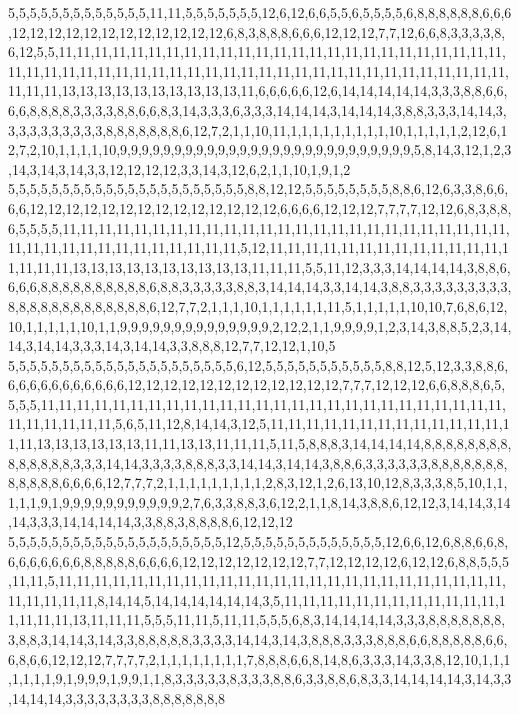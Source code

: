 5,5,5,5,5,5,5,5,5,5,5,5,5,11,11,5,5,5,5,5,5,5,12,6,12,6,6,5,5,6,5,5,5,5,6,8,8,8,8,8,8,6,6,6,12,12,12,12,12,12,12,12,12,12,12,12,6,8,3,8,8,8,6,6,6,12,12,12,7,7,12,6,6,8,3,3,3,3,8,6,12,5,5,11,11,11,11,11,11,11,11,11,11,11,11,11,11,11,11,11,11,11,11,11,11,11,11,11,11,11,11,11,11,11,11,11,11,11,11,11,11,11,11,11,11,11,11,11,11,11,11,11,11,11,11,11,11,11,11,13,13,13,13,13,13,13,13,13,13,11,6,6,6,6,6,12,6,14,14,14,14,14,3,3,3,8,8,6,6,6,6,8,8,8,8,3,3,3,3,8,8,6,6,8,3,14,3,3,3,6,3,3,3,14,14,14,3,14,14,14,3,8,8,3,3,3,14,14,3,3,3,3,3,3,3,3,3,3,8,8,8,8,8,8,8,6,12,7,2,1,1,10,11,1,1,1,1,1,1,1,1,1,10,1,1,1,1,1,2,12,6,12,7,2,10,1,1,1,1,10,9,9,9,9,9,9,9,9,9,9,9,9,9,9,9,9,9,9,9,9,9,9,9,9,9,9,9,5,8,14,3,12,1,2,3,14,3,14,3,14,3,3,12,12,12,12,3,3,14,3,12,6,2,1,1,10,1,9,1,2
5,5,5,5,5,5,5,5,5,5,5,5,5,5,5,5,5,5,5,5,5,5,8,8,12,12,5,5,5,5,5,5,5,5,8,8,6,12,6,3,3,8,6,6,6,6,12,12,12,12,12,12,12,12,12,12,12,12,12,12,6,6,6,6,12,12,12,7,7,7,7,12,12,6,8,3,8,8,6,5,5,5,5,11,11,11,11,11,11,11,11,11,11,11,11,11,11,11,11,11,11,11,11,11,11,11,11,11,11,11,11,11,11,11,11,11,11,11,11,11,11,5,12,11,11,11,11,11,11,11,11,11,11,11,11,11,11,11,11,11,13,13,13,13,13,13,13,13,13,13,11,11,11,5,5,11,12,3,3,3,14,14,14,14,3,8,8,6,6,6,6,8,8,8,8,8,8,8,8,8,8,6,8,8,3,3,3,3,3,8,8,3,14,14,14,3,3,14,14,3,8,8,3,3,3,3,3,3,3,3,3,8,8,8,8,8,8,8,8,8,8,8,8,8,6,12,7,7,2,1,1,1,10,1,1,1,1,1,1,11,5,1,1,1,1,1,10,10,7,6,8,6,12,10,1,1,1,1,1,10,1,1,9,9,9,9,9,9,9,9,9,9,9,9,9,9,2,12,2,1,1,9,9,9,9,1,2,3,14,3,8,8,5,2,3,14,14,3,14,14,3,3,3,14,3,14,14,3,3,8,8,8,12,7,7,12,12,1,10,5
5,5,5,5,5,5,5,5,5,5,5,5,5,5,5,5,5,5,5,5,5,6,12,5,5,5,5,5,5,5,5,5,5,5,8,8,12,5,12,3,3,8,8,6,6,6,6,6,6,6,6,6,6,6,6,12,12,12,12,12,12,12,12,12,12,12,12,7,7,7,12,12,12,6,6,8,8,8,6,5,5,5,5,11,11,11,11,11,11,11,11,11,11,11,11,11,11,11,11,11,11,11,11,11,11,11,11,11,11,11,11,11,11,11,11,5,6,5,11,12,8,14,14,3,12,5,11,11,11,11,11,11,11,11,11,11,11,11,11,11,11,13,13,13,13,13,13,11,11,13,13,11,11,11,5,11,5,8,8,8,3,14,14,14,14,8,8,8,8,8,8,8,8,8,8,8,8,8,8,3,3,3,14,14,3,3,3,3,8,8,8,3,3,14,14,3,14,14,3,8,8,6,3,3,3,3,3,3,8,8,8,8,8,8,8,8,8,8,8,8,6,6,6,6,12,7,7,7,2,1,1,1,1,1,1,1,1,1,2,8,3,12,1,2,6,13,10,12,8,3,3,3,8,5,10,1,1,1,1,1,9,1,9,9,9,9,9,9,9,9,9,9,9,2,7,6,3,3,8,8,3,6,12,2,1,1,8,14,3,8,8,6,12,12,3,14,14,3,14,14,3,3,3,14,14,14,14,3,3,8,8,3,8,8,8,8,6,12,12,12
5,5,5,5,5,5,5,5,5,5,5,5,5,5,5,5,5,5,5,5,12,5,5,5,5,5,5,5,5,5,5,5,5,5,12,6,6,12,6,8,8,6,6,8,6,6,6,6,6,6,6,8,8,8,8,8,6,6,6,6,12,12,12,12,12,12,12,7,7,12,12,12,12,6,12,12,6,8,8,5,5,5,11,11,5,11,11,11,11,11,11,11,11,11,11,11,11,11,11,11,11,11,11,11,11,11,11,11,11,11,11,11,11,11,11,8,14,14,5,14,14,14,14,14,14,3,5,11,11,11,11,11,11,11,11,11,11,11,11,11,11,11,11,13,11,11,11,5,5,5,11,11,5,11,11,5,5,5,6,8,3,14,14,14,14,3,3,3,8,8,8,8,8,8,8,3,8,8,3,14,14,3,14,3,3,8,8,8,8,8,3,3,3,3,14,14,3,14,3,8,8,8,3,3,3,8,8,8,6,6,8,8,8,8,8,6,6,6,8,6,6,12,12,12,7,7,7,7,2,1,1,1,1,1,1,1,1,7,8,8,8,6,6,8,14,8,6,3,3,3,14,3,3,8,12,10,1,1,1,1,1,1,1,9,1,9,9,9,1,9,9,1,1,8,3,3,3,3,3,8,3,3,3,8,8,6,3,3,8,8,6,8,3,3,14,14,14,14,3,14,3,3,14,14,14,3,3,3,3,3,3,3,3,8,8,8,8,8,8,8

